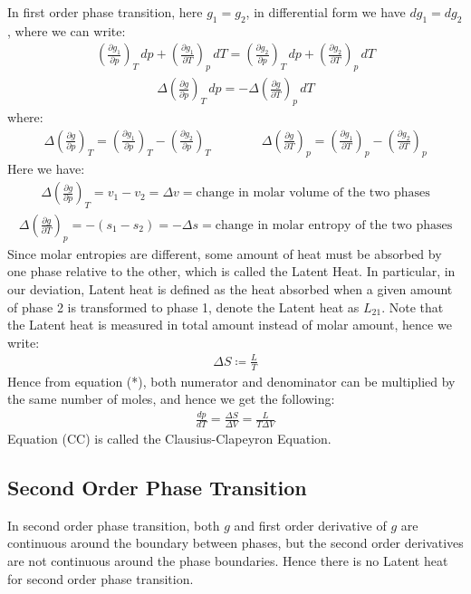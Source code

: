 \documentclass[11pt,oneside]{book}
\theoremstyle{break}
\theoremstyle{break}
\newcommand{\pd}{\partial}
\newcommand{\lr}[1]{\left( #1 \right)}
\begin{document}
In first order phase transition, here $g_1 = g_2$, in differential form we have $dg_1 = dg_2$, where we can write:
\begin{align*}
\lr{\frac{\pd g_1}{\pd p}}_T \, dp + \lr{\frac{\pd g_1}{\pd T}}_p \, dT =\lr{\frac{\pd g_2}{\pd p}}_T \, dp + \lr{\frac{\pd g_2}{\pd T}}_p \, dT  
\end{align*}
\begin{align*}
\Delta \lr{\frac{\pd g}{\pd p}}_T \, dp = -\Delta \lr{\frac{\pd g}{\pd T}}_p\, dT \tag{*}
\end{align*}
where:
\begin{align*}
\Delta \lr{\frac{\pd g}{\pd p}}_T = \lr{\frac{\pd g_1}{\pd p}}_T - \lr{\frac{\pd g_2}{\pd p}}_T\qquad\qquad \Delta \lr{\frac{\pd g}{\pd T}}_p = \lr{\frac{\pd g_1}{\pd T}}_p - \lr{\frac{\pd g_2}{\pd T}}_p
\end{align*}
Here we have:
\begin{align*}
\Delta \lr{\frac{\pd g}{\pd p}}_T = v_1 - v_2 = \Delta v = \text{change in molar volume of the two phases}
\end{align*}
\begin{align*}
\Delta \lr{\frac{\pd g}{\pd T}}_p = -(s_1 - s_2) = -\Delta s = \text{change in molar entropy of the two phases} 
\end{align*}
Since molar entropies are different, some amount of heat must be absorbed by one phase relative to the other, which is called the Latent Heat. In particular, in our deviation, Latent heat is defined as the heat absorbed when a given amount of phase 2 is transformed to phase 1, denote the Latent heat as $L_{21}$. Note that the Latent heat is measured in total amount instead of molar amount, hence we write:
\begin{align*}
\Delta S \coloneqq \frac{L}{T}
\end{align*}
Hence from equation (*), both numerator and denominator can be multiplied by the same number of moles, and hence we get the following:
\begin{align*}
\frac{dp}{dT} = \frac{\Delta S}{\Delta V} = \frac{L}{T\Delta V} \tag{CC}
\end{align*}
Equation (CC) is called the Clausius-Clapeyron Equation. \\


\subsection{Second Order Phase Transition}
In second order phase transition, both $g$ and first order derivative of $g$ are continuous around the boundary between phases, but the second order derivatives are not continuous around the phase boundaries. Hence there is no Latent heat for second order phase transition. 
\end{document}
